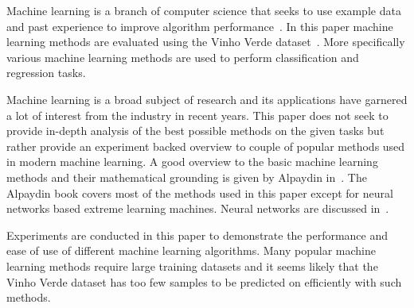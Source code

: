 Machine learning is a branch of computer science that seeks to use example data and past experience to improve algorithm performance~\cite{alpaydin:2004:introduction}. In this paper machine learning methods are evaluated using the Vinho Verde dataset~\cite{cortez:2009:modeling}. More specifically various machine learning methods are used to perform classification and regression tasks. 

Machine learning is a broad subject of research and its applications have garnered a lot of interest from the industry in recent years. This paper does not seek to provide in-depth analysis of the best possible methods on the given tasks but rather provide an experiment backed overview to couple of popular methods used in modern machine learning. A good overview to the basic machine learning methods and their mathematical grounding is given by Alpaydin in~\cite{alpaydin:2004:introduction}. The Alpaydin book covers most of the methods used in this paper except for neural networks based extreme learning machines. Neural networks are discussed in~\cite{haykin:2009:neural-networks}.

Experiments are conducted in this paper to demonstrate the performance and ease of use of different machine learning algorithms. Many popular machine learning methods require large training datasets and it seems likely that the Vinho Verde dataset has too few samples to be predicted on efficiently with such methods.

